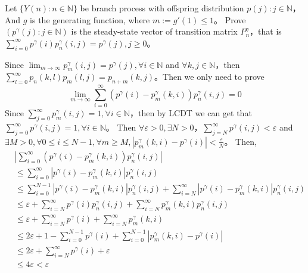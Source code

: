 \documentclass{ctexart}
\begin{document}
\begin{problem}\label{pro:5}
  Let \(\{Y(n): n \in \mathbb{N}\}\) be branch process with offspring distribution \(p(j): j \in \mathbb{N}\)\nolinebreak[4]，
  And \(g\) is the generating function, where \(m :=g' (1) \leq 1\)\nolinebreak[4]。
  Prove \((p^\gamma(j): j \in \mathbb{N})\) is the steady-state vector of
  transition matrix \(P_n^\gamma\)\nolinebreak[4]，that is \(\sum_{i =0}^{\infty} p^\gamma(i)p_n^\gamma(i,j)=p^{\gamma}(j), j \geq 0\)\nolinebreak[4]。
\end{problem}
\begin{solution}
  Since \(\lim_{m \to \infty}p_m^\gamma(i,j)=p^\gamma(j),\forall i \in \mathbb{N}\) and \(\forall k,j \in \mathbb{N}\)\nolinebreak[4]，then
  \(\sum_{l=0}^{\infty} p_n(k,l)p_m(l,j)=p_{n + m}(k,j)\)\nolinebreak[4]。Then we only need to prove \[
    \lim_{m \to \infty}\sum_{i=0}^{\infty} (p^\gamma(i)-p_m^\gamma(k,i))p_n^\gamma(i,j)=0
  \]
  Since \(\sum_{j=0}^\infty p_m^\gamma(i,j)=1, \forall i \in \mathbb{N}\)\nolinebreak[4]，then by LCDT we can get that
  \(\sum_{j=0}^{\infty} p^\gamma(i,j)=1, \forall i \in \mathbb{N}\)\nolinebreak[4]。
  Then \(\forall \varepsilon >0, \exists N>0\)\nolinebreak[4]，\(\sum_{j=N}^{\infty} p^\gamma(i,j) <\varepsilon\) and
  \(\exists M >0, \forall 0 \leq i \leq N-1, \forall m \geq M, |p_m^\gamma(k,i)-p^\gamma(i)| < \frac{\varepsilon}{N}\)\nolinebreak[4]。
  Then, \[
    \begin{aligned}
      & |\sum_{i=0}^{\infty} (p^\gamma(i)-p_m^\gamma(k,i))p_n^\gamma(i,j)|                                                                     \\
      & \leq \sum_{i=0}^{\infty} |p^\gamma(i)-p_m^\gamma(k,i)|p_n^\gamma(i,j)                                                                  \\
      & \leq \sum_{i=0}^{N-1} |p^\gamma(i)-p_m^\gamma(k,i)|p_n^\gamma(i,j) + \sum_{i=N}^{\infty}|p^\gamma(i)-p_m^{\gamma}(k,i)|p_n^\gamma(i,j) \\
      & \leq \varepsilon + \sum_{i=N}^{\infty} p^\gamma(i)p_n^\gamma(i,j) + \sum_{i=N}^{\infty} p_m^\gamma(k,i)p_n^\gamma(i,j)                 \\
      & \leq \varepsilon + \sum_{i=N}^{\infty} p^\gamma(i)+\sum_{i=N}^{\infty} p_m^\gamma(k,i)                                                 \\
      & \leq 2\varepsilon + 1-\sum_{i=0}^{N-1} p^\gamma(i)+\sum_{i=0}^{N-1} |p_m^\gamma(k,i)-p^\gamma(i)|                                      \\
      & \leq 2\varepsilon + \sum_{i=N}^{\infty} p^\gamma(i)+\varepsilon                                                                        \\
      & \leq 4\varepsilon < \varepsilon
    \end{aligned}
  \]
\end{solution}
\end{document}
